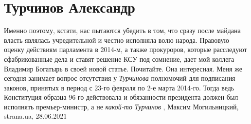  
 
 
 
 
\section{Турчинов Александр}

Именно поэтому, кстати, нас пытаются убедить в том, что сразу после майдана
власть являлась учредительной и честно исполняла волю народа.
Правовую оценку действиям парламента в 2014-м, а также прокуроров, которые
расследуют сфабрикованные дела и ставят решение КСУ под сомнение, дает мой
коллега Владимир Богатырь в своей новой статье. Почитайте. Она интересная.
Меня же сегодня занимает вопрос отсутствия у \emph{Турчинова} полномочий для
подписания законов, принятых в период с 23-го февраля по 2-е марта 2014-го.
Тогда ведь Конституция образца 96-го действовала и обязанности президента
должен был исполнять премьер-министр, а не \emph{какой-то Турчинов}
, 
Максим Могильницкий, strana.ua, 28.06.2021
